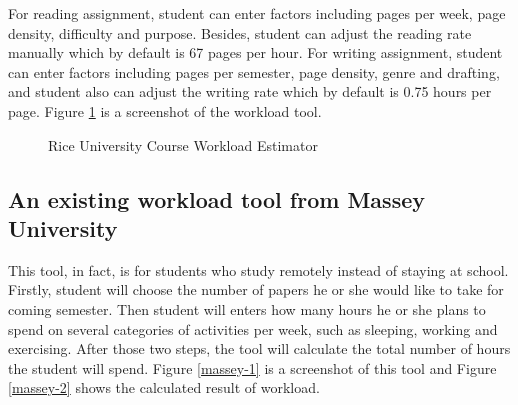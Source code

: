 \documentclass[fyp]{socreport}
\begin{document}
For reading assignment, student can enter factors including pages per week, page density, difficulty and purpose. Besides, student can adjust the reading rate manually which by default is 67 pages per hour. For writing assignment, student can enter factors including pages per semester, page density, genre and drafting, and student also can adjust the writing rate which by default is 0.75 hours per page. Figure {\ref{rice-1}} is a screenshot of the workload tool.

\begin{figure}
\caption{Rice University Course Workload Estimator}
\label{rice-1}
\end{figure}

\subsection{An existing workload tool from Massey University}
This tool, in fact, is for students who study remotely instead of staying at school. Firstly, student will choose the number of papers he or she would like to take for coming semester. Then student will enters how many hours he or she plans to spend on several categories of activities per week, such as sleeping, working and exercising. After those two steps, the tool will calculate the total number of hours the student will spend. Figure {\ref{massey-1}} is a screenshot of this tool and Figure {\ref{massey-2}} shows the calculated result of workload.
\end{document}
